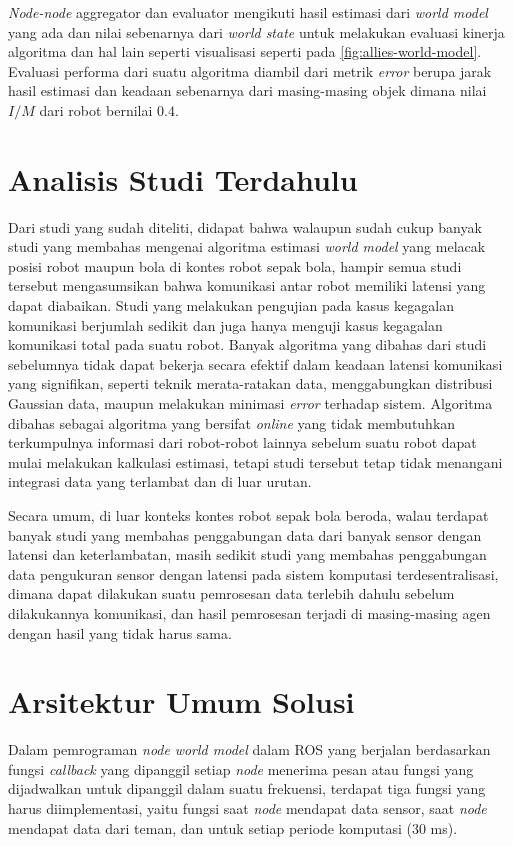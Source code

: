 \textit{Node-node} aggregator dan evaluator mengikuti hasil estimasi dari \textit{world model} yang ada dan nilai sebenarnya dari \textit{world state} untuk melakukan evaluasi kinerja algoritma dan hal lain seperti visualisasi seperti pada \ref{fig:allies-world-model}. Evaluasi performa dari suatu algoritma diambil dari metrik \textit{error} berupa jarak hasil estimasi dan keadaan sebenarnya dari masing-masing objek dimana nilai $I/M$ dari robot bernilai $0.4$.

\section{Analisis Studi Terdahulu}

Dari studi yang sudah diteliti, didapat bahwa walaupun sudah cukup banyak studi yang membahas mengenai algoritma estimasi \textit{world model} yang melacak posisi robot maupun bola di kontes robot sepak bola, hampir semua studi tersebut mengasumsikan bahwa komunikasi antar robot memiliki latensi yang dapat diabaikan. Studi yang melakukan pengujian pada kasus kegagalan komunikasi berjumlah sedikit dan juga hanya menguji kasus kegagalan komunikasi total pada suatu robot. Banyak algoritma yang dibahas dari studi sebelumnya tidak dapat bekerja secara efektif dalam keadaan latensi komunikasi yang signifikan, seperti teknik merata-ratakan data, menggabungkan distribusi Gaussian data, maupun melakukan minimasi \textit{error} terhadap sistem. Algoritma \citet{ahmad2017} dibahas sebagai algoritma yang bersifat \textit{online} yang tidak membutuhkan terkumpulnya informasi dari robot-robot lainnya sebelum suatu robot dapat mulai melakukan kalkulasi estimasi, tetapi studi tersebut tetap tidak menangani integrasi data yang terlambat dan di luar urutan.

Secara umum, di luar konteks kontes robot sepak bola beroda, walau terdapat banyak studi yang membahas penggabungan data dari banyak sensor dengan latensi dan keterlambatan, masih sedikit studi yang membahas penggabungan data pengukuran sensor dengan latensi pada sistem komputasi terdesentralisasi, dimana dapat dilakukan suatu pemrosesan data terlebih dahulu sebelum dilakukannya komunikasi, dan hasil pemrosesan terjadi di masing-masing agen dengan hasil yang tidak harus sama.

\section{Arsitektur Umum Solusi}

Dalam pemrograman \textit{node} \textit{world model} dalam ROS yang berjalan berdasarkan fungsi \textit{callback} yang dipanggil setiap \textit{node} menerima pesan atau fungsi yang dijadwalkan untuk dipanggil dalam suatu frekuensi, terdapat tiga fungsi yang harus diimplementasi, yaitu fungsi saat \textit{node} mendapat data sensor, saat \textit{node} mendapat data dari teman, dan untuk setiap periode komputasi ($30$ ms).

